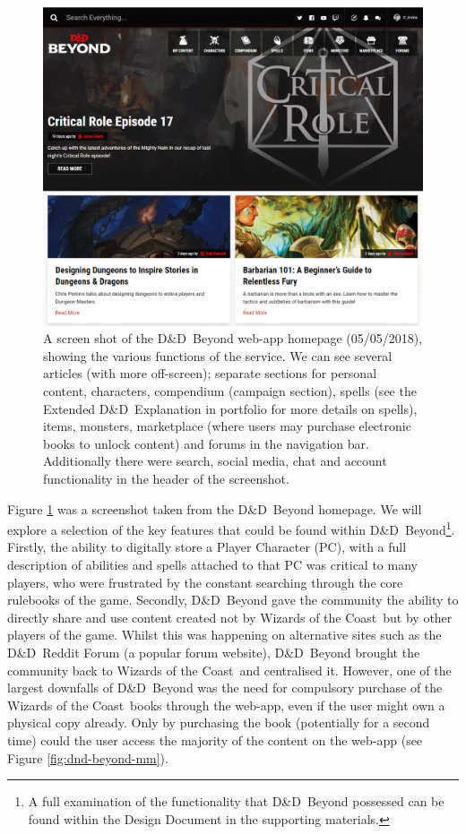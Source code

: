 \documentclass[final]{cmpreport}
\newcommand{\WotC}{Wizards of the Coast}
\newcommand{\dnd}{D\&D}
\begin{document}
			\begin{figure}[H]
				\centering
				\includegraphics[width=\linewidth]{dnd-beyond.png}
				\caption[\dnd \ Beyond homepage screenshot]{A screen shot of the \dnd \ Beyond web-app homepage (05/05/2018), showing the various functions of the service. We can see several articles (with more off-screen); separate sections for personal content, characters, compendium (campaign section), spells (see the Extended \dnd \ Explanation in portfolio for more details on spells), items, monsters, marketplace (where users may purchase electronic books to unlock content) and forums in the navigation bar. Additionally there were search, social media, chat and account functionality in the header of the screenshot.} \label{fig:dnd-beyond}
			\end{figure}
		
			Figure \ref{fig:dnd-beyond} was a screenshot taken from the \dnd \ Beyond homepage. We will explore a selection of the key features that could be found within \dnd \ Beyond\footnote{A full examination of the functionality that \dnd \ Beyond possessed can be found within the Design Document in the supporting materials.}. Firstly, the ability to digitally store a Player Character (PC), with a full description of abilities and spells attached to that PC was critical to many players, who were frustrated by the constant searching through the core rulebooks of the game. Secondly, \dnd \ Beyond gave the community the ability to directly share and use content created not by \WotC \ but by other players of the game. Whilst this was happening on alternative sites such as the \dnd \ Reddit Forum \citep{reddit-dnd} (a popular forum website), \dnd \ Beyond brought the community back to \WotC \ and centralised it. However, one of the largest downfalls of \dnd \ Beyond was the need for compulsory purchase of the \WotC \ books through the web-app, even if the user might own a physical copy already. Only by purchasing the book (potentially for a second time) could the user access the majority of the content on the web-app (see Figure \ref{fig:dnd-beyond-mm}).
			
\end{document}
